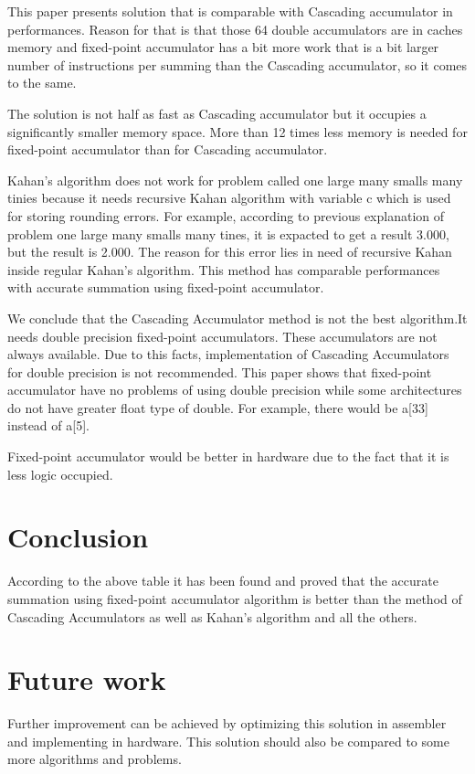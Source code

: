 \documentclass[conference]{IEEEtran}
\begin{document}
\par  
This paper presents solution that is comparable with Cascading 
accumulator in performances. Reason for that is that those 64 
double accumulators are in caches memory and fixed-point accumulator 
has a bit more work that is a bit larger number of instructions 
per summing than the Cascading accumulator, so it comes to the same.
\par 
The solution is not half as fast as Cascading accumulator but it 
occupies a significantly smaller memory space. More than 12 times 
less memory is needed for fixed-point accumulator than for Cascading accumulator.
\par 
Kahan's algorithm \cite{} does not work for problem called one large 
many smalls many tinies because it needs recursive Kahan 
algorithm with variable c which is used for storing rounding errors. 
For example, according to previous explanation of problem one 
large many smalls many tines, it is expacted to get a result 3.000, 
but the result is 2.000. The reason for this error lies in need of 
recursive Kahan inside regular Kahan's algorithm. This method has 
comparable performances with accurate summation using fixed-point accumulator.
\par 
We conclude that the Cascading Accumulator method \cite{} is not the
best algorithm.It needs double precision fixed-point accumulators.
These accumulators are not always available. Due to this facts, implementation of 
Cascading Accumulators for double precision is not recommended. 
This paper shows that fixed-point accumulator have no problems of 
using double precision while some architectures do not have greater float type of double. 
For example, there would be a[33] instead of a[5].
\par 
Fixed-point accumulator would be better in hardware due to the fact that it is less logic occupied.

\section{Conclusion}
According to the above table it has been found and proved
that the accurate summation using fixed-point accumulator 
algorithm is better than the method of Cascading Accumulators 
as well as Kahan's algorithm and all the others.


\section*{Future work}
Further improvement can be achieved by optimizing this
solution in assembler and implementing in hardware. 
This solution should also be compared to some more 
algorithms and problems. 




\end{document}
